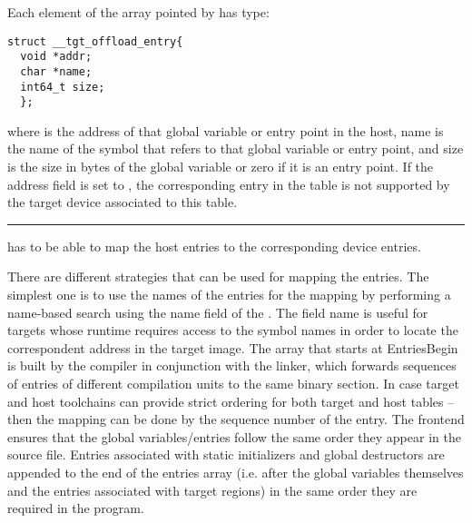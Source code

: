 Each element of the array pointed by  has type:
\begin{lstlisting}
struct __tgt_offload_entry{
  void *addr;
  char *name;
  int64_t size;
  };
\end{lstlisting}
%
where  is the address of that global variable or entry point in the host, name is the name of the 
symbol that refers to that global variable or entry point, and size is the size in bytes of the global variable or zero if it is an entry point. If the address field is set to , the corresponding entry in the table is not supported by the target device associated to this table.

\noindent\rule{\textwidth}{0.4pt}

\libomptarget{} has to be able to map the host entries to the corresponding device entries.

There are different strategies that can be used for mapping the entries. The simplest one is to use the names of the entries for the mapping by performing a name-based search using the name field of the . The field name is useful for targets whose runtime requires access to the symbol names in order to locate the correspondent address in the target image. The array that starts at EntriesBegin is built by the compiler in conjunction with the linker, which forwards sequences of entries of different compilation units to the same binary section. In case target and host toolchains can provide strict ordering for both target and host tables – then the mapping can be done by the sequence number of the entry. The frontend ensures that the global variables/entries follow the same order they appear in the source file. Entries associated with static initializers and global destructors are appended to the end of the entries array (i.e. after the global variables themselves and the entries associated with target regions) in the same order they are required in the program. 


